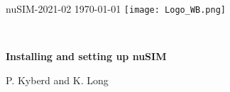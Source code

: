 \graphicspath{ {00-Top-matter/Figures/} }
\thispagestyle{empty}

\noindent nuSIM-2021-02 \hfill \today{} \hfill  \texttt{[image: Logo\_WB.png]}

\vspace{-0.25cm}
\noindent{\color{DarkYellow} \rule[0mm]{\textwidth}{0.43pt}}\\
\vspace{-0.50cm}
\begin{center}
  {\bf\LARGE\color{DarkBlue}
    Installing and setting up nuSIM
  }
\end{center}
\vspace{-0.4cm}
\begin{center}
  P. Kyberd and K. Long
\end{center}
\vspace{-0.2cm}
